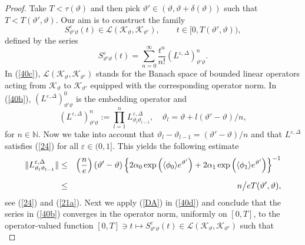 \documentclass[reqno,11pt]{amsart}
\theoremstyle{definition}
\theoremstyle{remark}
\numberwithin{equation}{section}
\begin{document}
\begin{proof}
Take $T <  \tau(\vartheta)$ and then pick $\vartheta' \in
(\vartheta, \vartheta + \delta(\vartheta))$ such that $ T<
T(\vartheta', \vartheta)$. Our aim is to construct the family
\begin{equation}
  \label{40c}
S^\varepsilon_{\vartheta'\vartheta} (t) \in
\mathcal{L}(\mathcal{K}_{\vartheta}, \mathcal{K}_{\vartheta'}),
\qquad t\in [0, T ( \vartheta', \vartheta)),
\end{equation}
defined by the series
\begin{equation}
  \label{40b}
S^\varepsilon_{\vartheta'\vartheta} (t) = \sum_{n=0}^\infty
\frac{t^n}{n!} \left( L^{\varepsilon,
\Delta}\right)^n_{\vartheta'\vartheta}.
\end{equation}
In (\ref{40c}), $\mathcal{L}(\mathcal{K}_{\vartheta},
\mathcal{K}_{\vartheta'})$ stands for the Banach space of bounded
linear operators acting from $\mathcal{K}_{\vartheta}$ to
$\mathcal{K}_{\vartheta'}$ equipped with the corresponding operator
norm. In (\ref{40b}), $\left( L^{\varepsilon,
\Delta}\right)^0_{\vartheta'\vartheta}$ is the embedding operator
and
\begin{equation}
  \label{40d}
\left( L^{\varepsilon, \Delta}\right)^n_{\vartheta'\vartheta} :=
\prod_{l=1}^n L^{\varepsilon, \Delta}_{\vartheta_l \vartheta_{l-1}},
\quad \vartheta_l = \vartheta + l(\vartheta'- \vartheta)/n,
\end{equation}
for $n\in \mathds{N}$. Now we take into account that $\vartheta_l -
\vartheta_{l-1}= (\vartheta'- \vartheta)/n$ and that
$L^{\varepsilon, \Delta}$ satisfies (\ref{24}) for all $\varepsilon
\in (0,1]$. This yields the following estimate
\begin{eqnarray}
  \label{DA}
\|L^{\varepsilon, \Delta}_{\vartheta_l \vartheta_{l-1}}\| & \leq &
\left(\frac{n}{e}\right)(\vartheta' - \vartheta)\left\{ 2 \alpha_0
\exp\left( \langle \phi_0 \rangle e^{\vartheta'}\right) + 2 \alpha_1
\exp\left( \langle \phi_1 \rangle
e^{\vartheta'}\right)\right\}^{-1} \nonumber \\[.2cm]
& \leq & n \big{/}e T (\vartheta', \vartheta),
\end{eqnarray}
see (\ref{24}) and (\ref{21a}). Next we apply (\ref{DA}) in
(\ref{40d}) and conclude that the series in (\ref{40b}) converges in
the operator norm, uniformly on $[0,T]$, to the operator-valued
function $[0,T] \ni t \mapsto S^\varepsilon_{\vartheta'\vartheta}
(t) \in \mathcal{L}(\mathcal{K}_{\vartheta},
\mathcal{K}_{\vartheta'})$ such that
\begin{equation}

\end{equation}
\end{proof}
\end{document}

